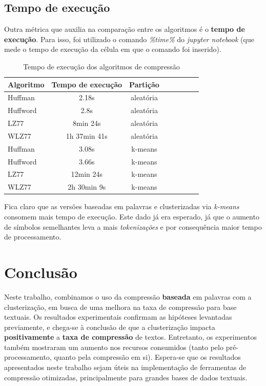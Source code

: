 \subsection{Tempo de execução}
Outra métrica que auxilia na comparação entre os algoritmos é o \textbf{tempo de execução}.
Para isso, foi utilizado o comando \emph{\%time\%} do \emph{jupyter notebook} (que mede o tempo de execução da célula em que o comando foi inserido).

\begin{table}[H]
   \centering
   \caption{Tempo de execução dos algoritmos de compressão} \label{tab:vcode}
   \begin{tabular}{|l|c|c|c|c|c|c|r|}
        \hline
        \small{Algoritmo} & \small{Tempo de execução} & \small{Partição} \\ \hline
              Huffman   &   2.18s                        & aleatória \\ \hline
              Huffword  &   2.8s                          & aleatória \\ \hline
              LZ77        &   8min 24s                  & aleatória \\ \hline
              WLZ77    &   1h 37min 41s           & aleatória \\ \hline
              Huffman  &   3.08s                       & k-means \\ \hline
              Huffword &   3.66s                       & k-means \\ \hline
              LZ77       &   12min 24s               & k-means \\ \hline
              WLZ77   &   2h 30min 9s            & k-means \\ \hline
  \end{tabular}
\end{table}

Fica claro que as versões baseadas em palavras e clusterizadas via \emph{k-means} consomem mais tempo de execução.
Este dado já era esperado, já que o aumento de símbolos semelhantes leva a mais \emph{tokenizações} e por consequência maior tempo de processamento.

\section{Conclusão}
Neste trabalho, combinamos o uso da compressão \textbf{baseada} em palavras com a clusterização, em busca de uma melhora na taxa de compressão para base textuais.
Os resultados experimentais confirmam as hipóteses levantadas previamente, 
e chega-se à conclusão de que a clusterização impacta \textbf{positivamente} a \textbf{taxa de compressão} de textos.
Entretanto, os experimentos também mostraram um aumento nos recursos consumidos (tanto pelo pré-processamento, quanto pela compressão em si).
Espera-se que os resultados apresentados neste trabalho sejam úteis na implementação de ferramentas de compressão otimizadas, principalmente para grandes bases de dados textuais.

